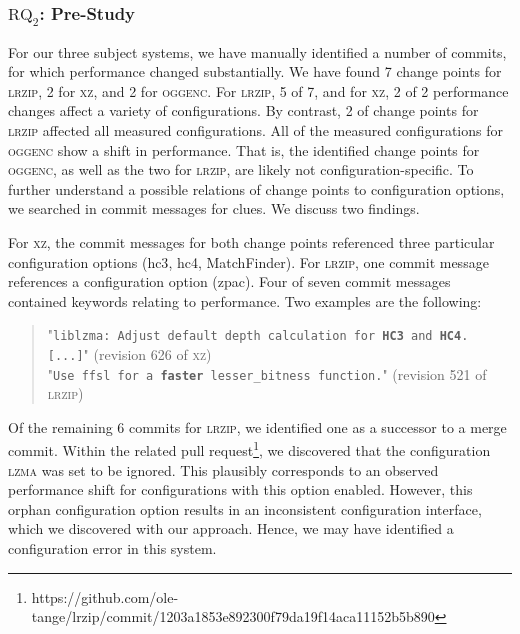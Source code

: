 \documentclass[sigconf]{acmart}
\begin{document}
	\subsubsection{$\text{RQ}_2$: Pre-Study}
	For our three subject systems, we have manually identified a number of commits, for which performance changed substantially. We have found 7 change points for \textsc{lrzip}, 2 for \textsc{xz}, and 2 for \textsc{oggenc}. For \textsc{lrzip}, 5 of 7, and for \textsc{xz}, 2 of 2 performance changes affect a variety of configurations. By contrast, 2 of change points for \textsc{lrzip} affected all measured configurations. All of the measured configurations for \textsc{oggenc} show a shift in performance. That is, the identified change points for \textsc{oggenc}, as well as the two for \textsc{lrzip}, are likely not configuration-specific. 	
	To further understand a possible relations of change points to configuration options, we searched in commit messages for clues. We discuss two findings. 
	
	For \textsc{xz}, the commit messages for both change points referenced three particular configuration options (\textsf{hc3}, \textsf{hc4}, \textsf{MatchFinder}). For \textsc{lrzip}, one commit message references a configuration option (\textsf{zpac}). Four of seven commit messages contained keywords relating to performance. Two examples are the following:
	
	\begin{quotation}
		"\texttt{\footnotesize liblzma: Adjust default depth calculation for \textbf{HC3} and \textbf{HC4}. [...]}" (revision 626 of \textsc{xz})\\
		"\texttt{\footnotesize Use ffsl for a \textbf{faster} lesser\_bitness function.}" (revision 521 of \textsc{lrzip})
	\end{quotation}
	
	Of the remaining 6 commits for \textsc{lrzip}, we identified one as a successor to a merge commit. Within the related pull request\footnote{https://github.com/ole-tange/lrzip/commit/1203a1853e892300f79da19f14aca11152b5b890}, we discovered that the configuration \textsc{lzma} was set to be ignored. This plausibly corresponds to an observed performance shift for configurations with this option enabled. However, this orphan configuration option results in an inconsistent configuration interface, which we discovered with our approach. Hence, we may have identified a configuration error in this system.
	
\end{document}
